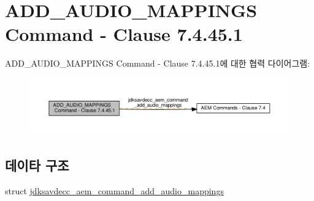 \hypertarget{group__command__add__audio__mappings}{}\section{A\+D\+D\+\_\+\+A\+U\+D\+I\+O\+\_\+\+M\+A\+P\+P\+I\+N\+GS Command -\/ Clause 7.4.45.1}
\label{group__command__add__audio__mappings}
A\+D\+D\+\_\+\+A\+U\+D\+I\+O\+\_\+\+M\+A\+P\+P\+I\+N\+GS Command -\/ Clause 7.4.45.1에 대한 협력 다이어그램\+:
\nopagebreak
\begin{figure}[H]
\begin{center}
\leavevmode
\includegraphics[width=350pt]{group__command__add__audio__mappings}
\end{center}
\end{figure}
\subsection*{데이타 구조}
\begin{DoxyCompactItemize}
\item 
struct \hyperlink{structjdksavdecc__aem__command__add__audio__mappings}{jdksavdecc\+\_\+aem\+\_\+command\+\_\+add\+\_\+audio\+\_\+mappings}
\end{DoxyCompactItemize}
